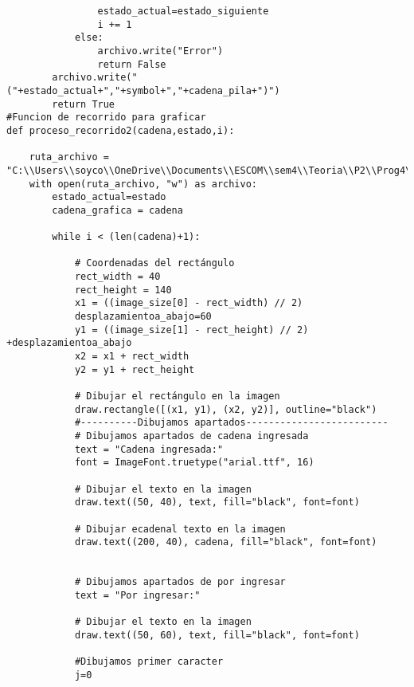 \begin{lstlisting}
                estado_actual=estado_siguiente
                i += 1
            else:
                archivo.write("Error")
                return False
        archivo.write("("+estado_actual+","+symbol+","+cadena_pila+")")    
        return True    
#Funcion de recorrido para graficar
def proceso_recorrido2(cadena,estado,i):
    
    ruta_archivo = "C:\\Users\\soyco\\OneDrive\\Documents\\ESCOM\\sem4\\Teoria\\P2\\Prog4\\output\\trancisiones.txt"
    with open(ruta_archivo, "w") as archivo:
        estado_actual=estado
        cadena_grafica = cadena
            
        while i < (len(cadena)+1):

            # Coordenadas del rectángulo
            rect_width = 40
            rect_height = 140
            x1 = ((image_size[0] - rect_width) // 2)
            desplazamientoa_abajo=60
            y1 = ((image_size[1] - rect_height) // 2) +desplazamientoa_abajo
            x2 = x1 + rect_width
            y2 = y1 + rect_height
            
            # Dibujar el rectángulo en la imagen
            draw.rectangle([(x1, y1), (x2, y2)], outline="black")
            #----------Dibujamos apartados-------------------------
            # Dibujamos apartados de cadena ingresada
            text = "Cadena ingresada:"
            font = ImageFont.truetype("arial.ttf", 16)

            # Dibujar el texto en la imagen
            draw.text((50, 40), text, fill="black", font=font)
            
            # Dibujar ecadenal texto en la imagen 
            draw.text((200, 40), cadena, fill="black", font=font) 
            
            
            # Dibujamos apartados de por ingresar
            text = "Por ingresar:"

            # Dibujar el texto en la imagen
            draw.text((50, 60), text, fill="black", font=font)
            
            #Dibujamos primer caracter
            j=0
            

\end{lstlisting}
